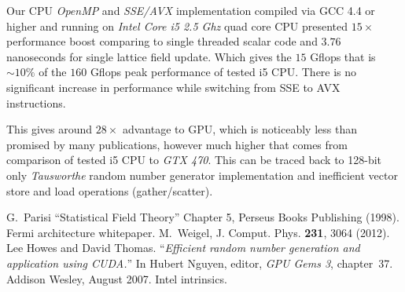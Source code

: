 \documentclass[a4paper]{llncs}
\begin{document}
Our CPU \emph{OpenMP} and \emph{SSE/AVX} implementation compiled via
GCC 4.4 or higher and running on \emph{Intel Core i5 2.5 Ghz} quad
core CPU presented $15\times$ performance boost comparing to single
threaded scalar code and $3.76$ nanoseconds for single lattice field
update.  Which gives the $15$ Gflops that is $\sim10\%$ of the  $160$
Gflops peak performance of tested i5 CPU. There is no significant
increase in performance while switching from SSE to AVX instructions.

This gives around $28\times$ advantage to GPU, which is noticeably
less than promised by many publications, however much higher that
comes from comparison of  tested i5
CPU to \emph{GTX 470}. This can be
traced back to 128-bit only \emph{Tausworthe} random number generator
implementation and inefficient vector store and load operations
(gather/scatter).

\begin{thebibliography}{9}
 G.~Parisi ``Statistical Field Theory'' Chapter 5, Perseus Books Publishing (1998).
 Fermi architecture whitepaper. 
 M.~Weigel, J. Comput. Phys. \textbf{231}, 3064 (2012).
Lee Howes and David Thomas.
``{\em Efficient random number generation and application using {CUDA}.}''
In Hubert Nguyen, editor, {\em GPU Gems 3}, chapter~37. Addison
  Wesley, August 2007.
 Intel intrinsics. 
\end{thebibliography}
\end{document}
